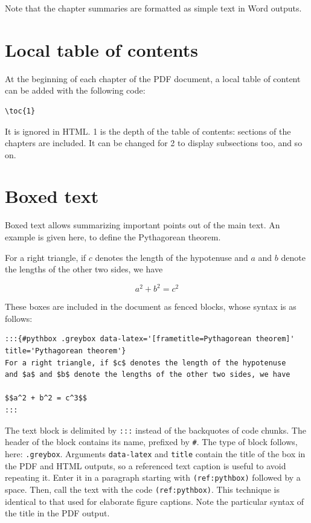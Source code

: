 \documentclass[
  12pt,
  american,
  a4paper,
  extrafontsizes,onecolumn,openright
  ]{memoir}
\newcommand{\toc}[1]{%
  \startcontents[chapters]%
  \printcontents[chapters]{}{1}[#1]{}%
  ~\newline%
}
\begin{document}
Note that the chapter summaries are formatted as simple text in Word outputs.

\section{Local table of contents}\label{local-table-of-contents}

At the beginning of each chapter of the PDF document, a local table of content can be added with the following code:

\begin{verbatim}
\toc{1}
\end{verbatim}

It is ignored in HTML.
1 is the depth of the table of contents: sections of the chapters are included.
It can be changed for 2 to display subsections too, and so on.

\section{Boxed text}\label{boxed-text}

Boxed text allows summarizing important points out of the main text.
An example is given here, to define the Pythagorean theorem.



\label{pythbox}
\begin{greybox}[frametitle=Pythagorean theorem]
For a right triangle, if \(c\) denotes the length of the hypotenuse
and \(a\) and \(b\) denote the lengths of the other two sides, we have

\[a^2 + b^2 = c^2\]

\end{greybox}

These boxes are included in the document as fenced blocks, whose syntax is as follows:

\begin{verbatim}
:::{#pythbox .greybox data-latex='[frametitle=Pythagorean theorem]'
title='Pythagorean theorem'}
For a right triangle, if $c$ denotes the length of the hypotenuse
and $a$ and $b$ denote the lengths of the other two sides, we have

$$a^2 + b^2 = c^3$$
:::
\end{verbatim}

The text block is delimited by \texttt{:::} instead of the backquotes of code chunks.
The header of the block contains its name, prefixed by \texttt{\#}.
The type of block follows, here: \texttt{.greybox}.
Arguments \texttt{data-latex} and \texttt{title} contain the title of the box in the PDF and HTML outputs, so a referenced text caption is useful to avoid repeating it.
Enter it in a paragraph starting with \texttt{(ref:pythbox)} followed by a space.
Then, call the text with the code \texttt{(ref:pythbox)}.
This technique is identical to that used for elaborate figure captions.
Note the particular syntax of the title in the PDF output.
\end{document}
